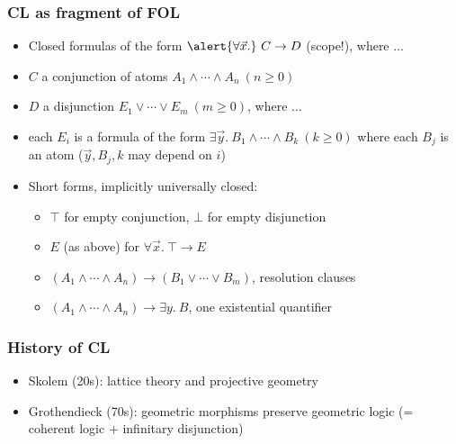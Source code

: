 \documentclass[handout,11pt]{beamer}
\begin{document}
\begin{frame}
\frametitle{CL as fragment of FOL}
 \begin{itemize}[<+->]   %
    \item Closed formulas of the form $\alert{\forall\vec{x}.}~C \to D$ \alert{(scope!)}, where ...
    \item $C$ a conjunction of atoms $A_1 \land \cdots \land A_n~(n\geq 0)$
    \item $D$ a disjunction $E_1 \lor \cdots \lor E_m~(m\geq 0)$, where ...
    \item each $E_i$ is a formula of the form $\exists \vec{y}.~B_1 \land \cdots \land B_k~(k\geq 0)$
              where each $B_j$ is an atom ($\vec{y}, B_j, k$ may depend on $i$)
    \item Short forms, implicitly universally closed: 
    \begin{itemize}
       \item $\top$ for empty conjunction, $\bot$ for empty disjunction         
       \item $E$ (as above) for $\forall \vec x.~\top\to E$
       \item $(A_1 \land \cdots \land A_n)\to(B_1 \lor \cdots \lor B_m)$, resolution clauses
       \item $(A_1 \land \cdots \land A_n)\to \exists y.~B$, one existential quantifier
    \end{itemize}
 \end{itemize}
\end{frame}

\begin{frame}
\frametitle{History of CL}
 \begin{itemize}[<+->]   %
    \item Skolem (20s):  lattice theory and projective geometry
    \item Grothendieck (70s): geometric morphisms preserve geometric
              logic (= coherent logic + infinitary disjunction)
 \end{itemize}
\end{frame}
\end{document}
